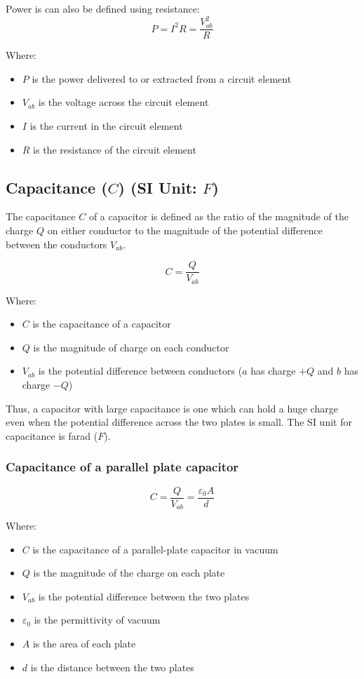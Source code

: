 \documentclass[11pt]{article}
\begin{document}
Power is can also be defined using resistance:
\[P = I^2 R = \frac{V_{ab}^2}{R}\]

Where:
\begin{itemize}
\item \(P\) is the power delivered to or extracted from a circuit element
\item \(V_{ab}\) is the voltage across the circuit element
\item \(I\) is the current in the circuit element
\item \(R\) is the resistance of the circuit element
\end{itemize}
\subsection{Capacitance (\(C\)) (SI Unit: \(\unit{F}\))}
\label{sec:org40a5b80}
The capacitance \(C\) of a capacitor is defined as the ratio of the magnitude of the charge \(Q\) on either conductor to the magnitude of the potential difference between the conductors \(V_{ab}\).

\[C = \frac{Q}{V_{ab}}\]

Where:
\begin{itemize}
\item \(C\) is the capacitance of a capacitor
\item \(Q\) is the magnitude of charge on each conductor
\item \(V_{ab}\) is the potential difference between conductors (\(a\) has charge \(+Q\) and \(b\) has charge \(-Q\))
\end{itemize}

Thus, a capacitor with large capacitance is one which can hold a huge charge even when the potential difference across the two plates is small. The SI unit for capacitance is farad (\(\unit{F}\)).
\subsubsection{Capacitance of a parallel plate capacitor}
\label{sec:org31399a9}
\[C = \frac{Q}{V_{ab}} = \frac{\varepsilon_0 A}{d}\]

Where:
\begin{itemize}
\item \(C\) is the capacitance of a parallel-plate capacitor in vacuum
\item \(Q\) is the magnitude of the charge on each plate
\item \(V_{ab}\) is the potential difference between the two plates
\item \(\varepsilon_0\) is the permittivity of vacuum
\item \(A\) is the area of each plate
\item \(d\) is the distance between the two plates
\end{itemize}
\end{document}
